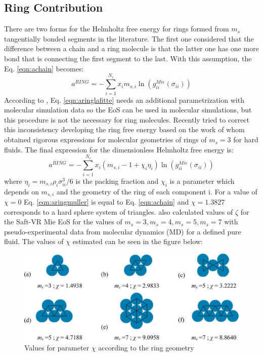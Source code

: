 \subsection{Ring Contribution}
There are two forms for the Helmholtz free energy for rings formed from $m_{s}$ tangentially bonded segments in the literature. The first one  \cite{lafitte2012} considered that the difference between a chain and a ring molecule is that the latter one has one more bond that is connecting the first segment to the last. With this assumption, the Eq. \eqref{eqn:achain} becomes:
\begin{equation}
a^{RING} =-\sum_{i=1}^{N_{c}} x_{i}m_{s,i}\ln(g_{ii}^{Mie}(\sigma_{ii}))
\label{eqn:aringlafitte}
\end{equation}
According to , Eq. \eqref{eqn:aringlafitte} needs an additional parametrization with molecular simulation data so the EoS can  be used in molecular simulations, but this procedure is not the necessary for ring molecules. Recently  tried to correct this inconsistency developing the ring free energy based on the work of  whom obtained rigorous expressions for molecular geometries of rings of $m_s=3$ for hard fluids. The final expression for the dimensionless Helmholtz free energy is:
\begin{equation}
a^{RING} =-\sum_{i=1}^{N_{c}} x_{i}(m_{s,i}-1+\chi_{i}\eta_{i})\ln(g_{ii}^{Mie}(\sigma_{ii}))
\label{eqn:aringmuller}
\end{equation}
where $\eta_{i}=m_{s,i}\rho_{i}\sigma_{ii}^{3}/6$ is the packing fraction and $\chi_{i}$ is a parameter which depends on $m_{s,i}$ and the geometry of the ring of each component i. For a value of $\chi=0$ Eq. \eqref{eqn:aringmuller} is equal to Eq. \eqref{eqn:achain} and $\chi=1.3827$ corresponds to a hard sphere system of triangles.  also calculated values of $\zeta$ for the Saft-VR Mie EoS for the values of $m_{s}=3,m_{s}=4,m_{s}=5,m_{s}=7$ with pseudo-experimental data from molecular dynamics (MD) for a defined pure fluid. The values of $\chi$ estimated can be seen in the figure below:
\begin{figure}[th]
\centering
\includegraphics[scale=0.8]{Figures/mullergeo.jpg}
\caption{Values for parameter $\chi$ according to the ring geometry \cite{muller2017}}
\label{fig:ringqsi}
\end{figure}
